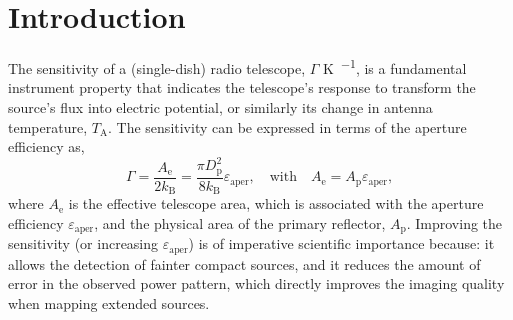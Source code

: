 \documentclass[
    ]
    {aa}
\begin{document}

    \maketitle

    \section{Introduction}
    \label{sec:intro}

    The sensitivity of a (single-dish) radio telescope, $\Gamma$ \si{\kelvin\per\jansky}, is a fundamental instrument property that indicates the telescope's response to transform the source's flux into electric potential, or similarly its change in antenna temperature, $T_\text{A}$.
    The sensitivity can be expressed in terms of the aperture efficiency as,
    \begin{equation}
        \Gamma = \frac{A_\text{e}}{2k_\text{B}} = \frac{\pi D^2_\text{p}}{8k_\text{B}} \varepsilon_\text{aper}, \quad\text{with}\quad A_\text{e}=A_\text{p}\varepsilon_\text{aper},
        \label{eq:sensitivity}
    \end{equation}
    where $A_\text{e}$ is the effective telescope area, which is associated with the aperture efficiency $\varepsilon_\text{aper}$, and the physical area of the primary reflector, $A_\text{p}$. Improving the sensitivity (or increasing $\varepsilon_\text{aper}$) is of imperative scientific importance because: it allows the detection of fainter compact sources, and it reduces the amount of error in the observed power pattern, which directly improves the imaging quality when mapping extended sources.
\end{document}
